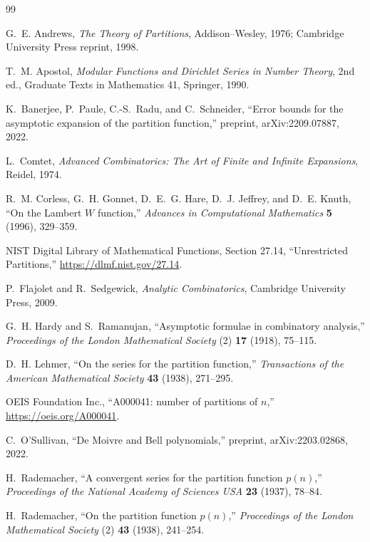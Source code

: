 \documentclass[11pt]{article}
\numberwithin{equation}{section}
\theoremstyle{mainthm}
\theoremstyle{defstyle}
\theoremstyle{remark}
\begin{document}
\begin{thebibliography}{99}

G.~E. Andrews,
\emph{The Theory of Partitions},
Addison--Wesley, 1976; Cambridge University Press reprint, 1998.

T.~M. Apostol,
\emph{Modular Functions and Dirichlet Series in Number Theory},
2nd ed., Graduate Texts in Mathematics 41, Springer, 1990.

K.~Banerjee, P.~Paule, C.-S.~Radu, and C.~Schneider,
``Error bounds for the asymptotic expansion of the partition function,''
preprint, arXiv:2209.07887, 2022.

L.~Comtet,
\emph{Advanced Combinatorics: The Art of Finite and Infinite Expansions},
Reidel, 1974.

R.~M. Corless, G.~H. Gonnet, D.~E.~G. Hare, D.~J. Jeffrey, and D.~E. Knuth,
``On the Lambert \(W\) function,''
\emph{Advances in Computational Mathematics} \textbf{5} (1996), 329--359.

NIST Digital Library of Mathematical Functions,
Section 27.14, ``Unrestricted Partitions,''
\url{https://dlmf.nist.gov/27.14}.

P.~Flajolet and R.~Sedgewick,
\emph{Analytic Combinatorics},
Cambridge University Press, 2009.

G.~H. Hardy and S.~Ramanujan,
``Asymptotic formulae in combinatory analysis,''
\emph{Proceedings of the London Mathematical Society} (2)
\textbf{17} (1918), 75--115.

D.~H. Lehmer,
``On the series for the partition function,''
\emph{Transactions of the American Mathematical Society}
\textbf{43} (1938), 271--295.

OEIS Foundation Inc.,
``A000041: number of partitions of \(n\),''
\url{https://oeis.org/A000041}.

C.~O'Sullivan,
``De Moivre and Bell polynomials,''
preprint, arXiv:2203.02868, 2022.

H.~Rademacher,
``A convergent series for the partition function \(p(n)\),''
\emph{Proceedings of the National Academy of Sciences USA}
\textbf{23} (1937), 78--84.

H.~Rademacher,
``On the partition function \(p(n)\),''
\emph{Proceedings of the London Mathematical Society} (2)
\textbf{43} (1938), 241--254.


\end{thebibliography}
\end{document}
